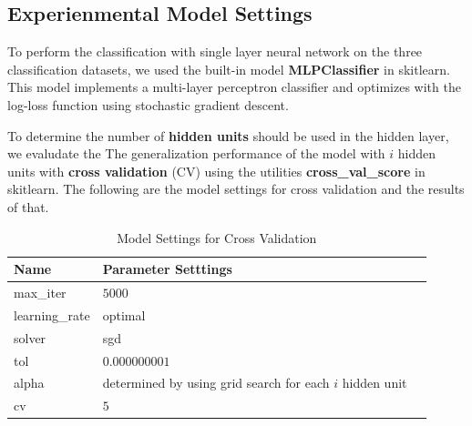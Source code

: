 \documentclass{article}
\begin{document}
\subsection{Experienmental Model Settings}

To perform the classification with single layer neural network on the three classification datasets, we used the built-in model \textbf{MLPClassifier} in skitlearn. This model implements a multi-layer perceptron classifier and optimizes with the log-loss function using stochastic gradient descent.

To determine the number of \textbf{hidden units} should be used in the hidden layer, we evaludate the The generalization performance of the model with $i$ hidden units with \textbf{cross validation} (CV) using the utilities \textbf{cross\_val\_score} in skitlearn. The following are the model settings for cross validation and the results of that.

\begin{table}[htb]
	\caption{Model Settings for Cross Validation}
	\label{sample-table}
	\centering
	\begin{tabular}{lll}
		\toprule
		\cmidrule{1-2}
		Name     &  Parameter Setttings	\\
		\midrule
		max\_iter & $5000$  \\
		learning\_rate & optimal  \\
		solver & sgd  \\
		tol & $0.000000001$        \\
		alpha & determined by using grid search for each $i$ hidden unit   \\
		cv & $5$     \\
		\bottomrule
	\end{tabular}
\end{table}
\end{document}
